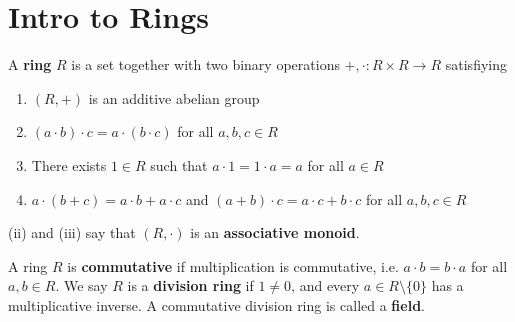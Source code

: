 
\section{Intro to Rings}

\begin{defn}[Rings]
    A \textbf{ring} $R$ is a set together with two binary operations $+,\cdot :R \times R \to R$ satisfiying
    \begin{enumerate}
        \item[(i)] $(R,+)$ is an additive abelian group
        \item[(ii)] $(a\cdot b)\cdot c=a\cdot (b \cdot c)$ for all $a,b,c\in R$
        \item[(iii)] There exists $1 \in R$ such that $a \cdot 1 = 1 \cdot a=a$ for all $a \in R$
        \item[(iv)] $a\cdot (b+c)=a\cdot b+a\cdot c$ and $(a+b)\cdot c= a\cdot c + b \cdot c$ for all $a,b,c \in R$
    \end{enumerate}
\end{defn}

\begin{rmk}
    (ii) and (iii) say that $(R,\cdot )$ is an \textbf{associative monoid}.
\end{rmk}

\begin{defn}
    A ring $R$ is \textbf{commutative} if multiplication is commutative, i.e. $a\cdot b = b \cdot a$ for all $a,b \in R$. We say $R$ is a \textbf{division ring} if $1 \neq 0$, and every $a \in R\setminus \{0\}$ has a multiplicative inverse. A commutative division ring is called a \textbf{field}.
\end{defn}

